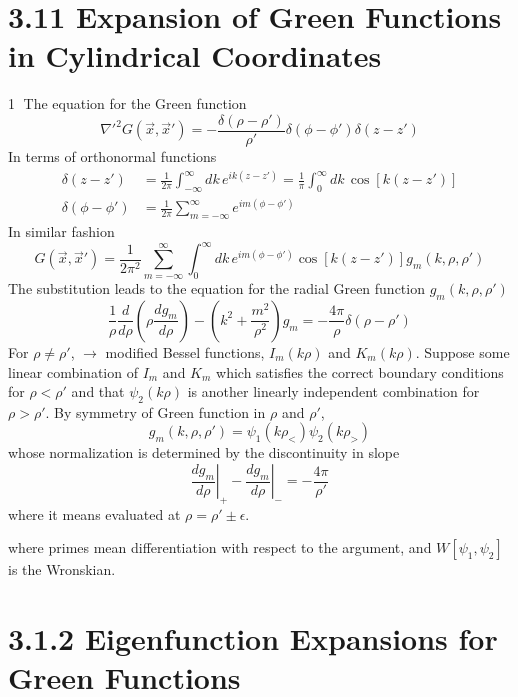 \documentclass{article}
\begin{document}
	\section*{3.11 Expansion of Green Functions in Cylindrical Coordinates}
	\textcircled{1} The equation for the Green function
	\begin{equation*}
		\nabla'^2 G(\vec{x}, \vec{x}') = -\frac{\delta(\rho-\rho')}{\rho'} \delta(\phi-\phi') \delta(z-z')
	\end{equation*}
	In terms of orthonormal functions
	\begin{align*}
		\delta(z-z') &= \frac{1}{2\pi} \int_{-\infty}^\infty dk \, e^{ik(z-z')} = \frac{1}{\pi} \int_0^\infty dk \, \cos[k(z-z')] \\
		\delta(\phi-\phi') &= \frac{1}{2\pi} \sum_{m=-\infty}^\infty e^{im(\phi-\phi')}
	\end{align*}
	In similar fashion
	\begin{equation*}
		G(\vec{x}, \vec{x}') = \frac{1}{2\pi^2} \sum_{m=-\infty}^\infty \int_0^\infty dk \, e^{im(\phi-\phi')} \cos[k(z-z')] g_m(k, \rho, \rho')
	\end{equation*}
	The substitution leads to the equation for the radial Green function $g_m(k,\rho,\rho')$
	\begin{equation*}
		\frac{1}{\rho} \frac{d}{d\rho} \left(\rho \frac{dg_m}{d\rho}\right) - \left(k^2+\frac{m^2}{\rho^2}\right) g_m = -\frac{4\pi}{\rho} \delta(\rho-\rho')
	\end{equation*}
	For $\rho \ne \rho'$, $\to$ modified Bessel functions, $I_m(k\rho)$ and $K_m(k\rho)$.
	Suppose some linear combination of $I_m$ and $K_m$ which satisfies the correct boundary conditions for $\rho < \rho'$ and that $\psi_2(k\rho)$ is another linearly independent combination for $\rho > \rho'$.
	By symmetry of Green function in $\rho$ and $\rho'$,
	\begin{equation*}
		g_m(k,\rho,\rho') = \psi_1(k\rho_<) \psi_2(k\rho_>)
	\end{equation*}
	whose normalization is determined by the discontinuity in slope
	\begin{equation*}
		\left. \frac{dg_m}{d\rho} \right|_{+} - \left. \frac{dg_m}{d\rho} \right|_{-} = -\frac{4\pi}{\rho'}
	\end{equation*}
	where it means evaluated at $\rho = \rho' \pm \epsilon$.
	
	where primes mean differentiation with respect to the argument, and $W[\psi_1, \psi_2]$ is the Wronskian.
	\section*{3.1.2 Eigenfunction Expansions for Green Functions}
	
\end{document}
